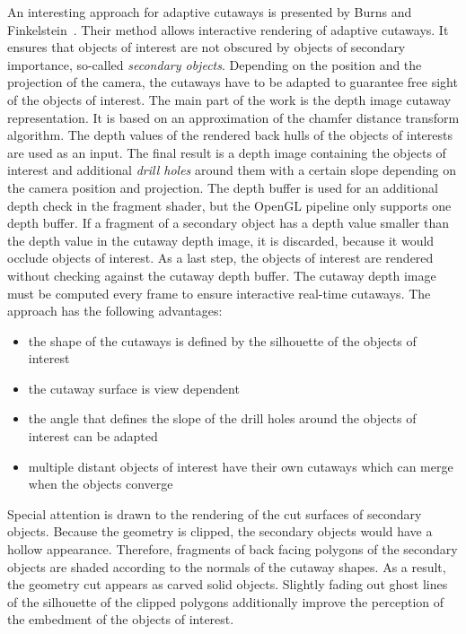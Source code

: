 An interesting approach for adaptive cutaways is presented by Burns and Finkelstein~\cite{jour:adaptiveCutaways}. Their method allows interactive rendering of adaptive cutaways. It ensures that objects of interest are not obscured by objects of secondary importance, so-called \emph{secondary objects}. Depending on the position and the projection of the camera, the cutaways have to be adapted to guarantee free sight of the objects of interest. The main part of the work is the depth image cutaway representation. It is based on an approximation of the chamfer distance transform algorithm. The depth values of the rendered back hulls of the objects of interests are used as an input. The final result is a depth image containing the objects of interest and additional \emph{drill holes} around them with a certain slope depending on the camera position and projection. The depth buffer is used for an additional depth check in the fragment shader, but the OpenGL pipeline only supports one depth buffer. If a fragment of a secondary object has a depth value smaller than the depth value in the cutaway depth image, it is discarded, because it would occlude objects of interest. As a last step, the objects of interest are rendered without checking against the cutaway depth buffer. The cutaway depth image must be computed every frame to ensure interactive real-time cutaways. The approach has the following advantages:
\begin{itemize}
	\item the shape of the cutaways is defined by the silhouette of the objects of interest
	\item the cutaway surface is view dependent
	\item the angle that defines the slope of the drill holes around the objects of interest can be adapted
	\item multiple distant objects of interest have their own cutaways which can merge when the objects converge
\end{itemize}

Special attention is drawn to the rendering of the cut surfaces of secondary objects. Because the geometry is clipped, the secondary objects would have a hollow appearance. Therefore, fragments of back facing polygons of the secondary objects are shaded according to the normals of the cutaway shapes. As a result, the geometry cut appears as carved solid objects. Slightly fading out ghost lines of the silhouette of the clipped polygons additionally improve the perception of the embedment of the objects of interest.

